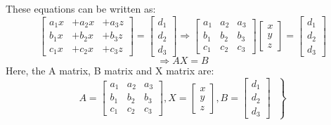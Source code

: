 \documentclass[a4paper, 12pt]{report}
\begin{document}
{      These equations can be written as:
      \begin{equation*}
      \begin{bmatrix}
      a_1x& + a_2x& + a_3z\\
      b_1x& + b_2x& + b_3z\\
      c_1x& + c_2x& + c_3z
      \end{bmatrix}
      =
       \begin{bmatrix}
       d_1\\
       d_2\\
       d_3
         \end{bmatrix}
        \Rightarrow
           \begin{bmatrix}
         a_1&a_2&a_3\\
         b_1&b_2&b_3\\
         c_1&c_2&c_3
         \end{bmatrix}
         \begin{bmatrix}
        x\\
        y\\
        z
         \end{bmatrix}
         =
         \begin{bmatrix}
         d_1\\
         d_2\\
         d_3
         \end{bmatrix}
      \end{equation*}
      \begin{equation}
      \Rightarrow AX=B
      \end{equation}
      Here, the A matrix, B matrix and X matrix are:
      \begin{equation}
      	\left.
      	A=
      \begin{bmatrix}
      a_1&a_2&a_3\\
      b_1&b_2&b_3\\
      c_1&c_2&c_3
      \end{bmatrix}
      ,X=
      \begin{bmatrix}
      x\\
      y\\
      z
      \end{bmatrix}
      ,B=
      \begin{bmatrix}
      d_1\\
      d_2\\
      d_3
      \end{bmatrix}~~~\right\}
      \end{equation}
}
\end{document}
